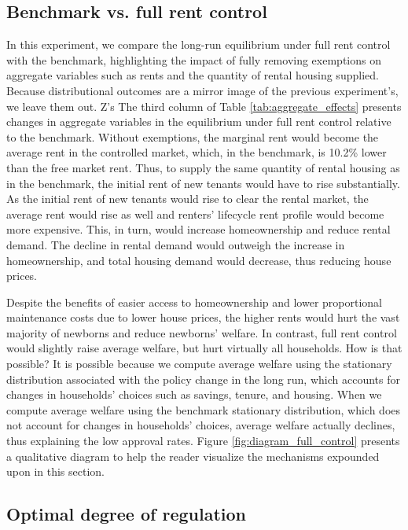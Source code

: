 \documentclass[parskip=full]{article}
\begin{document}
\subsection{Benchmark vs. full rent control}\label{subsection:full_control}

In this experiment, we compare the long-run equilibrium under full rent control with the benchmark, highlighting the impact of fully removing exemptions on aggregate variables such as rents and the quantity of rental housing supplied. Because distributional outcomes are a mirror image of the previous experiment's, we leave them out.
Z's
The third column of Table \ref{tab:aggregate_effects} presents changes in aggregate variables in the equilibrium under full rent control relative to the benchmark. Without exemptions, the marginal rent would become the average rent in the controlled market, which, in the benchmark, is 10.2\% lower than the free market rent. Thus, to supply the same quantity of rental housing as in the benchmark, the initial rent of new tenants would have to rise substantially. As the initial rent of new tenants would rise to clear the rental market, the average rent would rise as well and renters' lifecycle rent profile would become more expensive. This, in turn, would increase homeownership and reduce rental demand. The decline in rental demand would outweigh the increase in homeownership, and total housing demand would decrease, thus reducing house prices. 

Despite the benefits of easier access to homeownership and lower proportional maintenance costs due to lower house prices, the higher rents would hurt the vast majority of newborns and reduce newborns' welfare. In contrast, full rent control would slightly raise average welfare, but hurt virtually all households. How is that possible? It is possible because we compute average welfare using the stationary distribution associated with the policy change in the long run, which accounts for changes in households' choices such as savings, tenure, and housing. When we compute average welfare using the benchmark stationary distribution, which does not account for changes in households' choices, average welfare actually declines, thus explaining the low approval rates. Figure \ref{fig:diagram_full_control} presents a qualitative diagram to help the reader visualize the mechanisms expounded upon in this section. 

\subsection{Optimal degree of regulation}\label{subsection:optimal_control}
\end{document}
